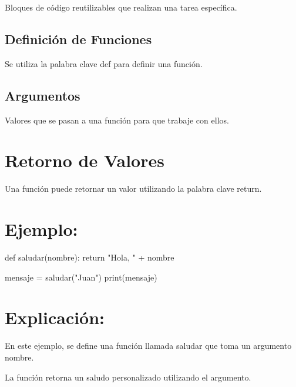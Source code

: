 \documentclass[
  a4paper,
  DIV=11,
  numbers=noendperiod,
  onepage,
  openany]{scrreprt}
\newenvironment{Shaded}{\begin{snugshade}}{\end{snugshade}}
\newcommand{\BuiltInTok}[1]{\textcolor[rgb]{0.00,0.23,0.31}{#1}}
\newcommand{\ControlFlowTok}[1]{\textcolor[rgb]{0.00,0.23,0.31}{#1}}
\newcommand{\KeywordTok}[1]{\textcolor[rgb]{0.00,0.23,0.31}{#1}}
\newcommand{\NormalTok}[1]{\textcolor[rgb]{0.00,0.23,0.31}{#1}}
\newcommand{\OperatorTok}[1]{\textcolor[rgb]{0.37,0.37,0.37}{#1}}
\newcommand{\StringTok}[1]{\textcolor[rgb]{0.13,0.47,0.30}{#1}}
\begin{document}
Bloques de código reutilizables que realizan una tarea específica.

\hypertarget{definiciuxf3n-de-funciones}{%
\subsection{Definición de Funciones}\label{definiciuxf3n-de-funciones}}

Se utiliza la palabra clave def para definir una función.

\hypertarget{argumentos}{%
\subsection{Argumentos}\label{argumentos}}

Valores que se pasan a una función para que trabaje con ellos.

\hypertarget{retorno-de-valores}{%
\section{Retorno de Valores}\label{retorno-de-valores}}

Una función puede retornar un valor utilizando la palabra clave return.

\hypertarget{ejemplo-44}{%
\section{Ejemplo:}\label{ejemplo-44}}

\begin{Shaded}
\begin{Highlighting}[]
\KeywordTok{def}\NormalTok{ saludar(nombre):}
    \ControlFlowTok{return} \StringTok{"Hola, "} \OperatorTok{+}\NormalTok{ nombre}

\NormalTok{mensaje }\OperatorTok{=}\NormalTok{ saludar(}\StringTok{"Juan"}\NormalTok{)}
\BuiltInTok{print}\NormalTok{(mensaje)}
\end{Highlighting}
\end{Shaded}

\hypertarget{explicaciuxf3n-44}{%
\section{Explicación:}\label{explicaciuxf3n-44}}

En este ejemplo, se define una función llamada saludar que toma un
argumento nombre.

La función retorna un saludo personalizado utilizando el argumento.
\end{document}
